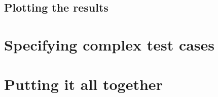 \subsection{Plotting the results}





\section{Specifying complex test cases}




\section{Putting it all together}


